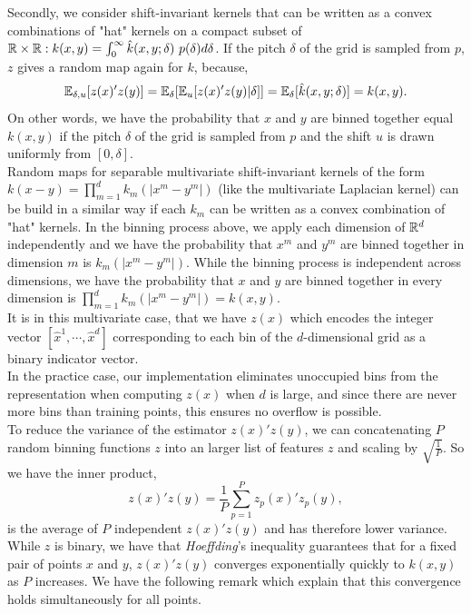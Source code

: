 \documentclass{article}
\begin{document}
Secondly, we consider shift-invariant kernels that can be written as a convex combinations of "hat" kernels on a compact subset of $\mathbb{R} \times \mathbb{R} : k(x,y) = \int_0^{\infty} \hat{k}(x,y;\delta)\ p(\delta) d\delta$. If the pitch $\delta$ of the grid is sampled from $p$, $z$ gives a random map again for $k$, because, 
\begin{equation*}
    \mathbb{E}_{\delta, u}[z(x)'z(y)] = \mathbb{E}_{\delta}[\mathbb{E}_u[z(x)'z(y) | \delta]] = \mathbb{E}_{\delta}[\hat{k}(x,y;\delta)] = k(x,y).
\end{equation*}
On other words, we have the probability that $x$ and $y$ are binned together equal $k(x,y)$ if the pitch $\delta$ of the grid is sampled from $p$ and the shift $u$ is drawn uniformly from $[0, \delta]$.\\

Random maps for separable multivariate shift-invariant kernels of the form $k(x-y) = \prod_{m=1}^d k_m (|x^m - y^m |)$ (like the multivariate Laplacian kernel) can be build in a similar way if each $k_m$ can be written as a convex combination of "hat" kernels. In the binning process above, we apply each dimension of $\mathbb{R}^d$ independently and we have the probability that $x^m$ and $y^m$ are binned together in dimension $m$ is $k_m(|x^m - y^m|)$. While the binning process is independent across dimensions, we have the probability that $x$ and $y$ are binned together in every dimension is $\prod_{m=1}^d k_m(|x^m - y^m|) = k(x,y)$. \\
It is in this multivariate case, that we have $z(x)$ which encodes the integer vector $[\hat{x}^1, \cdots, \hat{x}^d]$ corresponding to each bin of the $d$-dimensional grid as a binary indicator vector. \\
In the practice case, our implementation eliminates unoccupied bins from the representation when computing $z(x)$ when $d$ is large, and since there are never more bins than training points, this ensures no overflow is possible. \\

To reduce the variance of the estimator $z(x)' z(y)$, we can concatenating $P$ random binning functions $z$ into an larger list of features $z$ and scaling by $\sqrt{\frac{1}{P}}$. So we have the inner product, 
\begin{equation*}
    z(x)'z(y) = \frac{1}{P} \sum_{p=1}^P z_p(x)' z_p(y),
\end{equation*}
is the average of $P$ independent $z(x)' z(y)$ and has therefore lower variance.\\
While $z$ is binary, we have that \textit{Hoeffding}'s inequality guarantees that for a fixed pair of points $x$ and $y$, $z(x)'z(y)$ converges exponentially quickly to $k(x,y)$ as $P$ increases. We have the following remark which explain that this convergence holds simultaneously for all points.
\end{document}
